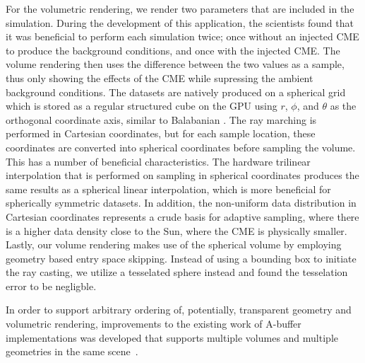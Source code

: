 For the volumetric rendering, we render two parameters that are included in the simulation.  During the development of this application, the scientists found that it was beneficial to perform each simulation twice; once without an injected CME to produce the background conditions, and once with the injected CME.  The volume rendering then uses the difference between the two values as a sample, thus only showing the effects of the CME while supressing the ambient background conditions.  The datasets are natively produced on a spherical grid which is stored as a regular structured  cube on the GPU using $r$, $\phi$, and $\theta$ as the orthogonal coordinate axis, similar to Balabanian \etal \cite{balabanian2007sonar}.  The ray marching is performed in Cartesian coordinates, but for each sample location, these coordinates are converted into spherical coordinates before sampling the volume.  This has a number of beneficial characteristics.  The hardware trilinear interpolation that is performed on sampling in spherical coordinates produces the same results as a spherical linear interpolation, which is more beneficial for spherically symmetric datasets.  In addition, the non-uniform data distribution in Cartesian coordinates represents a crude basis for adaptive sampling, where there is a higher data density close to the Sun, where the CME is physically smaller.  Lastly, our volume rendering makes use of the spherical volume by employing geometry based entry space skipping.  Instead of using a bounding box to initiate the ray casting, we utilize a tesselated sphere instead and found the tesselation error to be negligble.

In order to support arbitrary ordering of, potentially, transparent geometry and volumetric rendering, improvements to the existing work of A-buffer implementations was developed that supports multiple volumes and multiple geometries in the same scene~\cite{lindholm14hybrid}.


